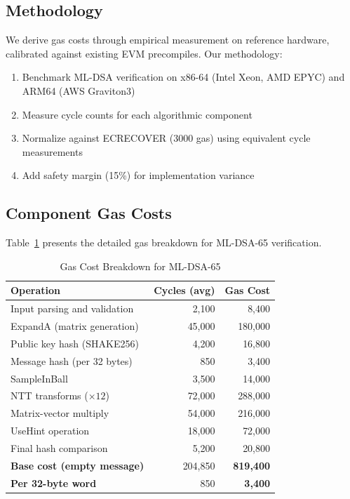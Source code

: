 \documentclass[11pt,a4paper]{article}
\begin{document}
\subsection{Methodology}

We derive gas costs through empirical measurement on reference hardware, calibrated against existing EVM precompiles. Our methodology:

\begin{enumerate}
    \item Benchmark ML-DSA verification on x86-64 (Intel Xeon, AMD EPYC) and ARM64 (AWS Graviton3)
    \item Measure cycle counts for each algorithmic component
    \item Normalize against ECRECOVER (3000 gas) using equivalent cycle measurements
    \item Add safety margin (15\%) for implementation variance
\end{enumerate}

\subsection{Component Gas Costs}

Table~\ref{tab:gas} presents the detailed gas breakdown for ML-DSA-65 verification.

\begin{table}[htbp]
\centering
\caption{Gas Cost Breakdown for ML-DSA-65}
\label{tab:gas}
\begin{tabular}{@{}lrr@{}}
\toprule
Operation & Cycles (avg) & Gas Cost \\
\midrule
Input parsing and validation & 2,100 & 8,400 \\
ExpandA (matrix generation) & 45,000 & 180,000 \\
Public key hash (SHAKE256) & 4,200 & 16,800 \\
Message hash (per 32 bytes) & 850 & 3,400 \\
SampleInBall & 3,500 & 14,000 \\
NTT transforms ($\times 12$) & 72,000 & 288,000 \\
Matrix-vector multiply & 54,000 & 216,000 \\
UseHint operation & 18,000 & 72,000 \\
Final hash comparison & 5,200 & 20,800 \\
\midrule
\textbf{Base cost (empty message)} & 204,850 & \textbf{819,400} \\
\textbf{Per 32-byte word} & 850 & \textbf{3,400} \\
\bottomrule
\end{tabular}
\end{table}
\end{document}
